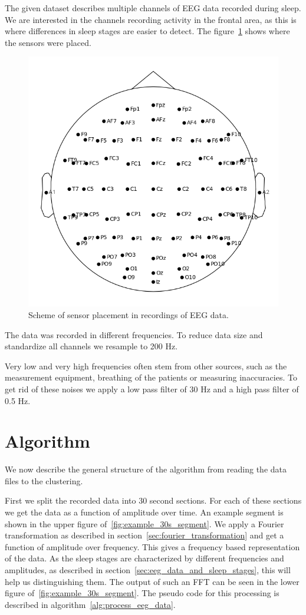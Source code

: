 The given dataset describes multiple channels of EEG data recorded during sleep. We are interested in the channels recording activity in the frontal area, as this is where differences in sleep stages are easier to detect\cite[chapter~11]{Ganong1997}. The figure~\ref{fig:head_placement} shows where the sensors were placed.

\begin{figure}
	\centering
	\includegraphics[width=0.7\linewidth]{figs/head_placement}
	\caption{Scheme of sensor placement in recordings of EEG data.}
	\label{fig:head_placement}
\end{figure}

The data was recorded in different frequencies. To reduce data size and standardize all channels we resample to 200 Hz.

Very low and very high frequencies often stem from other sources, such as the measurement equipment, breathing of the patients or measuring inaccuracies. To get rid of these noises we apply a low pass filter of 30 Hz and a high pass filter of 0.5 Hz.

\section{Algorithm}
\label{sec:algorithm}

We now describe the general structure of the algorithm from reading the data files to the clustering.

First we split the recorded data into 30 second sections. For each of these sections we get the data as a function of amplitude over time. An example segment is shown in the upper figure of~\ref{fig:example_30s_segment}. We apply a Fourier transformation as described in section~\ref{sec:fourier_transformation} and get a function of amplitude over frequency. This gives a frequency based representation of the data. As the sleep stages are characterized by different frequencies and amplitudes, as described in section~\ref{sec:eeg_data_and_sleep_stages}, this will help us distinguishing them. The output of such an FFT can be seen in the lower figure of~\ref{fig:example_30s_segment}. The pseudo code for this processing is described in algorithm~\ref{alg:process_eeg_data}.

